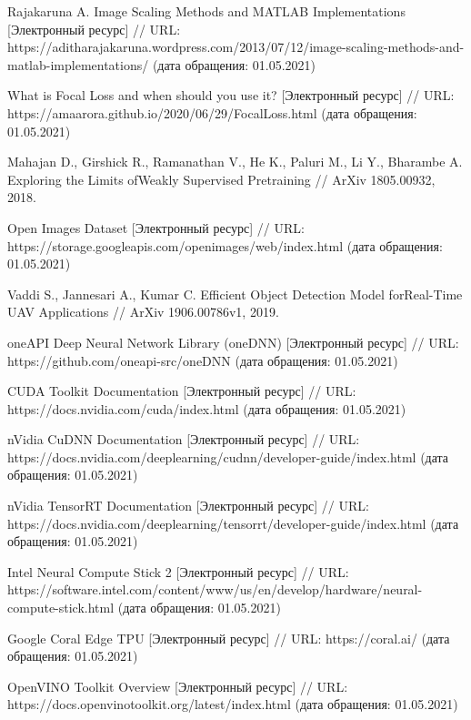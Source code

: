\begin{thebibliography}{00}
    Rajakaruna A.
    Image Scaling Methods and MATLAB Implementations
    [Электронный ресурс] //
    URL: https://aditharajakaruna.wordpress.com/2013/07/12/image-scaling-methods-and-matlab-implementations/
    (дата обращения: 01.05.2021)

    What is Focal Loss and when should you use it?
    [Электронный ресурс] //
    URL: https://amaarora.github.io/2020/06/29/FocalLoss.html
    (дата обращения: 01.05.2021)

    Mahajan D., Girshick R., Ramanathan V., He K., Paluri M., Li Y., Bharambe A.  
    Exploring the Limits ofWeakly Supervised Pretraining //
    ArXiv 1805.00932, 2018.

    Open Images Dataset
    [Электронный ресурс] //
    URL: https://storage.googleapis.com/openimages/web/index.html
    (дата обращения: 01.05.2021)

    Vaddi S., Jannesari A., Kumar C.
    Efficient Object Detection Model forReal-Time UAV Applications //
    ArXiv 1906.00786v1, 2019.

    oneAPI Deep Neural Network Library (oneDNN)
    [Электронный ресурс] //
    URL: https://github.com/oneapi-src/oneDNN
    (дата обращения: 01.05.2021)
    
    CUDA Toolkit Documentation
    [Электронный ресурс] //
    URL: https://docs.nvidia.com/cuda/index.html
    (дата обращения: 01.05.2021)

    nVidia CuDNN Documentation
    [Электронный ресурс] //
    URL: https://docs.nvidia.com/deeplearning/cudnn/developer-guide/index.html
    (дата обращения: 01.05.2021)

    nVidia TensorRT Documentation
    [Электронный ресурс] //
    URL: https://docs.nvidia.com/deeplearning/tensorrt/developer-guide/index.html
    (дата обращения: 01.05.2021)

    Intel Neural Compute Stick 2
    [Электронный ресурс] //
    URL: https://software.intel.com/content/www/us/en/develop/hardware/neural-compute-stick.html
    (дата обращения: 01.05.2021)

    Google Coral Edge TPU
    [Электронный ресурс] //
    URL: https://coral.ai/
    (дата обращения: 01.05.2021)

    OpenVINO Toolkit Overview
    [Электронный ресурс] //
    URL: https://docs.openvinotoolkit.org/latest/index.html
    (дата обращения: 01.05.2021)
 

\end{thebibliography}
